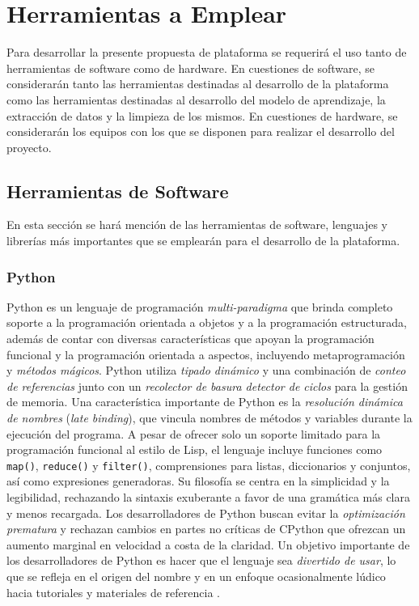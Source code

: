 \section{Herramientas a Emplear}

Para desarrollar la presente propuesta de plataforma se requerirá el uso tanto
de herramientas de software como de hardware. En cuestiones de software, se
considerarán tanto las herramientas destinadas al desarrollo de la plataforma
como las herramientas destinadas al desarrollo del modelo de aprendizaje,
la extracción de datos y la limpieza de los mismos. En cuestiones de hardware,
se considerarán los equipos con los que se disponen para realizar el desarrollo
del proyecto.

\subsection{Herramientas de Software}

En esta sección se hará mención de las herramientas de software, lenguajes y
librerías más importantes que se emplearán para el desarrollo de la plataforma.

\subsubsection{Python}

Python es un lenguaje de programación \textit{multi-paradigma} que brinda completo
soporte a la programación orientada a objetos y a la programación estructurada,
además de contar con diversas características que apoyan la programación funcional
y la programación orientada a aspectos, incluyendo metaprogramación y
\textit{métodos mágicos}. Python utiliza \textit{tipado dinámico} y una
combinación de \textit{conteo de referencias} junto con un
\textit{recolector de basura detector de ciclos} para la gestión de memoria.
Una característica importante de Python es la \textit{resolución dinámica de nombres}
(\textit{late binding}), que vincula nombres de métodos y variables durante la
ejecución del programa. A pesar de ofrecer solo un soporte limitado para la
programación funcional al estilo de Lisp, el lenguaje incluye funciones como
\texttt{map()}, \texttt{reduce()} y \texttt{filter()}, comprensiones para listas,
diccionarios y conjuntos, así como expresiones generadoras. Su filosofía se centra
en la simplicidad y la legibilidad, rechazando la sintaxis exuberante a favor de
una gramática más clara y menos recargada. Los desarrolladores de Python buscan
evitar la \textit{optimización prematura} y rechazan cambios en partes no críticas
de CPython que ofrezcan un aumento marginal en velocidad a costa de la claridad.
Un objetivo importante de los desarrolladores de Python es hacer que el lenguaje
sea \textit{divertido de usar}, lo que se refleja en el origen del nombre y en
un enfoque ocasionalmente lúdico hacia tutoriales y materiales de referencia
\cite{van2007python}.

